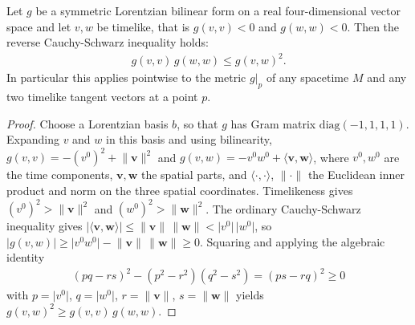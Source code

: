 \begin{lemma}
    \label{lmm:reverse-cauchy-schwarz}
    \leanok
    Let $g$ be a symmetric Lorentzian bilinear form on a real four-dimensional vector space and let $v, w$ be timelike, that is $g(v,v) < 0$ and $g(w,w) < 0$. Then the reverse Cauchy-Schwarz inequality holds:
    \begin{align}
        g(v,v)\, g(w,w) \le g(v,w)^2.
    \end{align}
    In particular this applies pointwise to the metric $g|_p$ of any spacetime $M$ and any two timelike tangent vectors at a point $p$.
\end{lemma}
\begin{proof}
    \leanok
    Choose a Lorentzian basis $b$, so that $g$ has Gram matrix $\mathrm{diag}(-1,1,1,1)$. Expanding $v$ and $w$ in this basis and using bilinearity, $g(v,v) = -(v^0)^2 + \lVert \mathbf{v}\rVert^2$ and $g(v,w) = -v^0 w^0 + \langle \mathbf{v}, \mathbf{w}\rangle$, where $v^0, w^0$ are the time components, $\mathbf{v}, \mathbf{w}$ the spatial parts, and $\langle\cdot,\cdot\rangle$, $\lVert\cdot\rVert$ the Euclidean inner product and norm on the three spatial coordinates. Timelikeness gives $(v^0)^2 > \lVert\mathbf{v}\rVert^2$ and $(w^0)^2 > \lVert\mathbf{w}\rVert^2$. The ordinary Cauchy-Schwarz inequality gives $\lvert\langle\mathbf{v},\mathbf{w}\rangle\rvert \le \lVert\mathbf{v}\rVert\,\lVert\mathbf{w}\rVert < \lvert v^0\rvert\,\lvert w^0\rvert$, so $\lvert g(v,w)\rvert \ge \lvert v^0 w^0\rvert - \lVert\mathbf{v}\rVert\,\lVert\mathbf{w}\rVert \ge 0$. Squaring and applying the algebraic identity
    \begin{align}
        (pq - rs)^2 - (p^2 - r^2)(q^2 - s^2) = (ps - rq)^2 \ge 0
    \end{align}
    with $p = \lvert v^0\rvert$, $q = \lvert w^0\rvert$, $r = \lVert\mathbf{v}\rVert$, $s = \lVert\mathbf{w}\rVert$ yields $g(v,w)^2 \ge g(v,v)\,g(w,w)$.
\end{proof}

